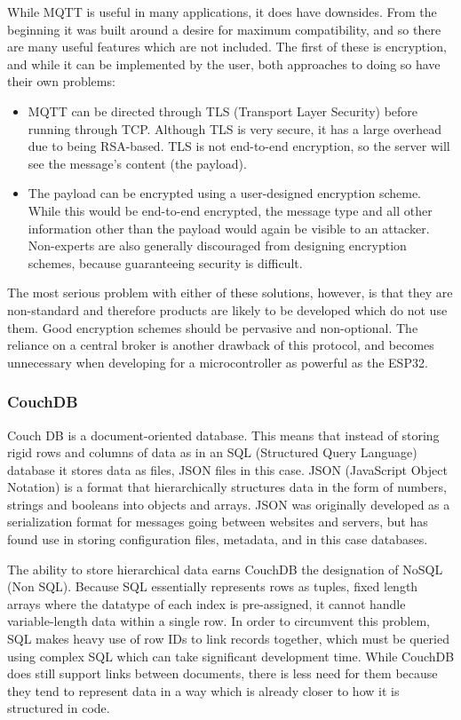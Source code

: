 \documentclass{article}
\begin{document}
While MQTT is useful in many applications, it does have downsides. From the beginning it was built around a desire for maximum compatibility, and so there are many useful features which are not included. The first of these is encryption, and while it can be implemented by the user, both approaches to doing so have their own problems:
\begin{itemize}
\item MQTT can be directed through TLS (Transport Layer Security) before running through TCP. Although TLS is very secure, it has a large overhead due to being RSA-based. TLS is not end-to-end encryption, so the server will see the message's content (the payload).
\item The payload can be encrypted using a user-designed encryption scheme. While this would be end-to-end encrypted, the message type and all other information other than the payload would again be visible to an attacker. Non-experts are also generally discouraged from designing encryption schemes, because guaranteeing security is difficult.
\end{itemize}

The most serious problem with either of these solutions, however, is that they are non-standard and therefore products are likely to be developed which do not use them. Good encryption schemes should be pervasive and non-optional. The reliance on a central broker is another drawback of this protocol, and becomes unnecessary when developing for a microcontroller as powerful as the ESP32.

\subsubsection{CouchDB}

Couch DB is a document-oriented database. This means that instead of storing rigid rows and columns of data as in an SQL (Structured Query Language) database it stores data as files, JSON files in this case. JSON (JavaScript Object Notation) is a format that hierarchically structures data in the form of numbers, strings and booleans into objects and arrays. JSON was originally developed as a serialization format for messages going between websites and servers, but has found use in storing configuration files, metadata, and in this case databases.

The ability to store hierarchical data earns CouchDB the designation of NoSQL (Non SQL). Because SQL essentially represents rows as tuples, fixed length arrays where the datatype of each index is pre-assigned, it cannot handle variable-length data within a single row. In order to circumvent this problem, SQL makes heavy use of row IDs to link records together, which must be queried using complex SQL which can take significant development time. While CouchDB does still support links between documents, there is less need for them because they tend to represent data in a way which is already closer to how it is structured in code.
\end{document}
